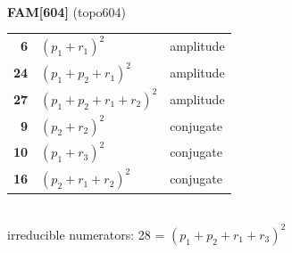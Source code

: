 \documentclass[10pt]{article}
\begin{document}
\begin{minipage}[t]{0.48\textwidth}
{}\\[2mm]\textbf{FAM[604]} (topo604)\\[2pt]{\footnotesize\begin{tabular}{@{}r@{\ \ }l@{\ \ }l@{}}\textbf{6} & $(p_1+r_1)^2$ & amplitude\\
\textbf{24} & $(p_1+p_2+r_1)^2$ & amplitude\\
\textbf{27} & $(p_1+p_2+r_1+r_2)^2$ & amplitude\\
\textbf{9} & $(p_2+r_2)^2$ & conjugate\\
\textbf{10} & $(p_1+r_3)^2$ & conjugate\\
\textbf{16} & $(p_2+r_1+r_2)^2$ & conjugate\\\end{tabular}}\\[2pt]{\scriptsize irreducible numerators: 28 = $(p_1+p_2+r_1+r_3)^2$}\end{minipage}\hfill%
\end{document}
